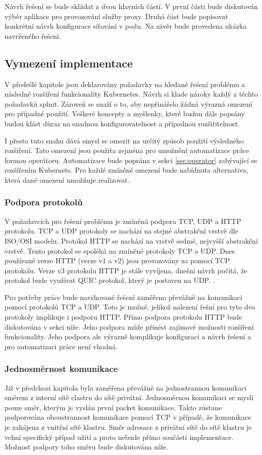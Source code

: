 Návrh řešení se bude skládat z dvou hlavních částí. V první části bude diskutován výběr aplikace pro provozování služby proxy. Druhá část bude popisovat konkrétní návrh konfigurace síťování v podu. Na závěr bude provedena ukázka navrženého řešení.

\subsection{Vymezení implementace}
V předešlé kapitole jsou deklarovány požadavky na hledané řešení problému a následné rozšíření funkcionality Kubernetes. Návrh si klade nároky každý z těchto požadavků splnit. Zároveň se snaží o to, aby nepřinášelo žádná výrazná omezení pro případné použití. Veškeré koncepty a myšlenky, které budou dále popsány budou klást důraz na snadnou konfigurovatelnost a případnou rozšiřitelnost.

I přesto tuto snahu dává smysl se omezit na určitý způsob použití výsledného rozšíření. Tato omezení jsou použita zejména pro umožnění automatizace práce formou operátoru. Automatizace bude popsána v sekci \ref{sec:operator} zabývající se rozšířením Kubernets. Pro každé zmíněné omezení bude nabídnuta alternativa, která dané omezení umožňuje realizovat. 

\subsubsection*{Podpora protokolů}
V požadavcích pro řešení problému je zmíněná podpora TCP, UDP a HTTP protokolu. TCP a UDP protokoly se nachází na stejné abstrakční vrstvě dle ISO/OSI modelu. Protokol HTTP se nachází na vrstvě sedmé, nejvyšší abstrakční vrstvě. Tento protokol se spoléhá na zmíněné protokoly TCP a UDP. Dnes používané verze HTTP (verze v1 a v2) jsou provozovány za pomocí TCP protokolu. Verze v3 protokolu HTTP je stále vyvíjena, dnešní návrh počítá, že protokol bude využívat QUIC protokol, který je postaven na UDP. \cite{fesl_2021_aplikan}.

Pro potřeby práce bude navrhované řešení zaměřeno převážně na komunikaci pomocí protokolů TCP a UDP. Toto je možné, jelikož nalezení řešní pro tyto dva protokoly implikuje i podporu HTTP. Přímo podpora protokolu HTTP bude diskutována v sekci níže. Jeho podpora může přinést zajímavé možnosti rozšíření funkcionality. Jeho podpora ale výrazně komplikuje konfiguraci a návrh řešení a pro automatizaci práce není vhodná.

\subsubsection*{Jednosměrnost komunikace}\label{vymezeni:1smer}
Již v předchozí kapitola byla zaměřena převážně na jednostrannou komunikaci směrem z interní sítě clastru do sítě privátní. Jednosměrnou komunikaci se myslí pouze směr, kterým je vyslán první packet komunikace. Takto zůstane podporována oboustrannost komunikace pomocí TCP v případě, že komunikace je zahájena z vnitřní sítě klastru. Směr adresace z privátní sítě do sítě klastru je velmi specifický případ užití a proto nebude přímo součástí implementace. Možnost podpory toho směru bude diskutována níže.

